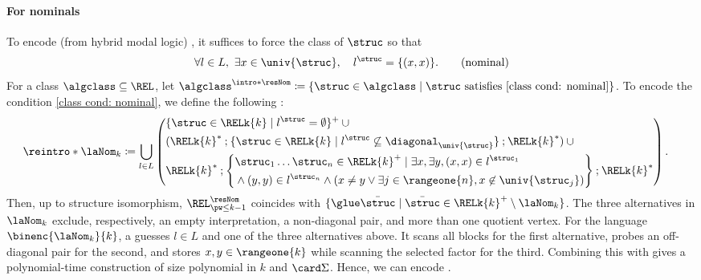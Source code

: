 \documentclass[a4paper,UKenglish,cleveref, autoref, thm-restate]{lipics-v2021}
\DeclarePairedDelimiter\set{\{}{\}}
\DeclarePairedDelimiter\tuple{(}{)}
\newcommand{\defeq}{\coloneq}
\newcommand{\mul}[1]{\bar{#1}}
\newcommand{\compo}{\mathbin{;}}
\newcommand{\vsig}{\Sigma}
\begin{document}
\paragraph*{For nominals}
To encode \intro*{} (from hybrid modal logic) \cite{arecesHybridLogics2007}, it suffices to force the class of  $\struc$
so that
\begin{align*}
\forall l \in L,\ \exists x \in \univ{\struc},\quad
l^{\struc} = \set{(x,x)}. \tag{nominal}\label{class cond: nominal}
\end{align*}
\AP
For a class $\algclass \subseteq \REL$,
let $\algclass^{\intro*\resNom} \defeq \set{\struc \in \algclass \mid \text{$\struc$ satisfies \eqref{class cond: nominal}}}$.
To encode the condition \eqref{class cond: nominal}, we define the following :
\AP
{}
\begin{align*}
    \reintro*\laNom_{k} &\defeq
    \bigcup_{l \in L}
    \left(\begin{aligned}
       & \set{\struc \in \RELk{k} \mid l^{\struc} = \emptyset}^{+} \cup {} \\
       & (\RELk{k}^{*} \compo \set{\struc \in \RELk{k} \mid l^{\struc} \not\subseteq \diagonal_{\univ{\struc}}} \compo \RELk{k}^{*}) \cup {} \\
       & \RELk{k}^{*} \compo \set*{
            \begin{aligned}
                &\struc_1 \dots \struc_{n} \in \RELk{k}^{+} \mid \exists x, \exists y, \tuple{x, x} \in l^{\struc_1}   \\
                &{} \land \tuple{y, y} \in l^{\struc_n} \land  (x \neq y \lor \exists j \in \rangeone{n}, x \not\in \univ{\struc_{j}})
            \end{aligned}} \compo \RELk{k}^{*}
    \end{aligned}\right).
\end{align*}
Then, up to structure isomorphism, $\REL^{\resNom}_{\pw \le k-1}$ coincides with
$\set{\glue \mul{\struc} \mid \mul{\struc} \in \RELk{k}^{+} \setminus \laNom_{k}}$.
The three alternatives in $\laNom_k$ exclude, respectively, an empty interpretation, a non-diagonal pair, and more than one quotient vertex.
For the language $\binenc{\laNom_{k}}{k}$,
a  guesses $l\in L$ and one of the three alternatives above.
It scans all blocks for the first alternative, probes an off-diagonal pair for the second,
and stores $x,y\in\rangeone{k}$ while scanning the selected factor for the third.
Combining this with  gives a polynomial-time construction
of size polynomial in $k$ and $\card\vsig$.
Hence, we can encode .
\end{document}
